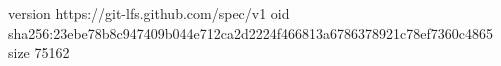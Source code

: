 version https://git-lfs.github.com/spec/v1
oid sha256:23ebe78b8c947409b044e712ca2d2224f466813a6786378921c78ef7360c4865
size 75162
